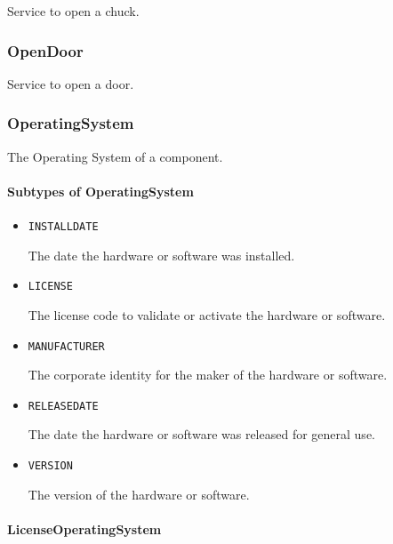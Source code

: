 Service to open a chuck.


\subsubsection{OpenDoor}
\label{sec:OpenDoor}



Service to open a door.


\subsubsection{OperatingSystem}
\label{sec:OperatingSystem}



The Operating System of a component.


\paragraph{Subtypes of OperatingSystem}\mbox{}
\label{sec:Subtypes of OperatingSystem}

\begin{itemize}

\item \texttt{INSTALL\textunderscore DATE}


The date the hardware or software was installed.

\item \texttt{LICENSE}


The license code to validate or activate the hardware or software.

\item \texttt{MANUFACTURER}


The corporate identity for the maker of the hardware or software.


\item \texttt{RELEASE\textunderscore DATE}


The date the hardware or software was released for general use.


\item \texttt{VERSION}


The version of the hardware or software.


\end{itemize}

\paragraph{LicenseOperatingSystem}\mbox{}
\label{sec:LicenseOperatingSystem}


